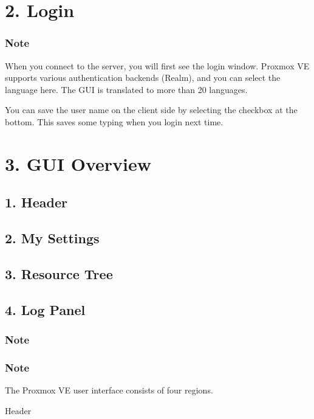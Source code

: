 \section{2. Login}

\subsubsection{Note}

When you connect to the server, you will first see the login window. Proxmox VE supports various authentication backends (Realm), and you can select the language here. The GUI is translated to more than 20 languages.

You can save the user name on the client side by selecting the checkbox at the bottom. This saves some typing when you login next time.


\section{3. GUI Overview}

\subsection{1. Header}

\subsection{2. My Settings}

\subsection{3. Resource Tree}

\subsection{4. Log Panel}

\subsubsection{Note}

\subsubsection{Note}

The Proxmox VE user interface consists of four regions.

Header

